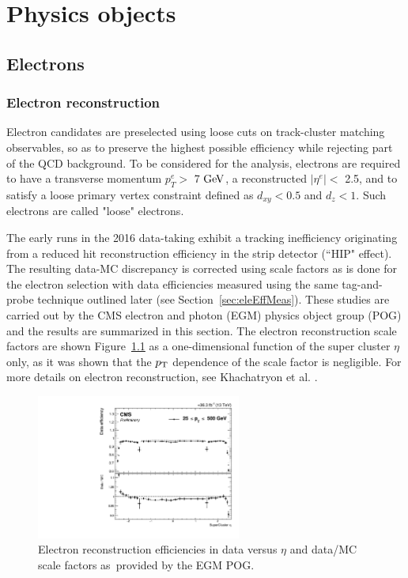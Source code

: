 \chapter{Physics objects}\label{sec:objects}

\section{Electrons}

\subsection{Electron reconstruction}
\label{sec:eleReco}


Electron candidates are preselected using loose cuts on track-cluster matching observables, so as to preserve the highest possible efficiency while rejecting part of the QCD background. To be considered for the analysis, electrons are required to have a
transverse momentum $p^e_T >$ 7 $\mathrm{Ge\kern -0.1em V}$, a reconstructed $|\eta^e| <$ 2.5, and to satisfy a loose primary vertex 
constraint defined as $d_{xy} < 0.5$ and $d_z < 1$. 
Such electrons are called "loose" electrons.

The early runs in the 2016 data-taking exhibit a tracking inefficiency originating from a reduced hit reconstruction efficiency in the strip detector (``HIP" effect). 
The resulting data-MC discrepancy is corrected using scale factors as is done for the electron selection with data efficiencies measured using the same tag-and-probe technique outlined later (see Section~\ref{sec:eleEffMeas}). 
These studies are carried out by the CMS electron and photon (EGM) physics object group (POG) and the results are summarized in this section.
The electron reconstruction scale factors are shown Figure~\ref{fig:ele_rec_scale_factors} as a one-dimensional function of the super cluster $\eta$ only, as it was shown that the $p_{\rm{T}}$ dependence of the scale factor is negligible. For more details on electron reconstruction, see Khachatryon et al. \cite{ElectronLegacy}. 

\begin{figure}[!htb]
\vspace*{0.3cm}
\begin{center}
\includegraphics[width=0.6\textwidth]{Figures/Electrons/ele_rec_scale_factors.pdf}
\end{center}
\caption{Electron reconstruction efficiencies in data versus $\eta$ and data/MC scale factors as provided by the EGM POG.}
\label{fig:ele_rec_scale_factors}
\end{figure}

